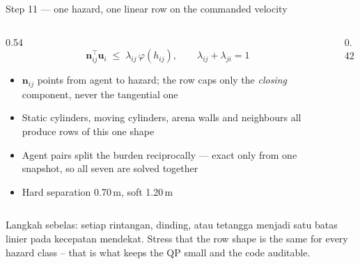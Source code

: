 \documentclass[aspectratio=169,11pt,t]{beamer}
\begin{document}
\begin{frame}{Step 11 --- one hazard, one linear row on the commanded velocity}
  \begin{columns}[T,onlytextwidth]
    \begin{column}{0.54\textwidth}
      \vskip1mm {\small
      \[ \mathbf{n}_{ij}^{\top}\mathbf{u}_i\;\le\;\lambda_{ij}\,\varphi(h_{ij}),
         \qquad \lambda_{ij}+\lambda_{ji}=1 \]}
      \begin{itemize}\bulletgap\scriptsize
        \item $\mathbf{n}_{ij}$ points from agent to hazard; the row caps only
              the \emph{closing} component, never the tangential one
        \item Static cylinders, moving cylinders, arena walls and neighbours all
              produce rows of this one shape
        \item Agent pairs split the burden reciprocally --- exact only from one
              snapshot, so all seven are solved together
        \item Hard separation 0.70\,m, soft 1.20\,m
      \end{itemize}
    \end{column}
    \begin{column}{0.42\textwidth}
      \centering\vskip2mm
      \scalebox{0.60}{\diagrow}
    \end{column}
  \end{columns}
    {Langkah sebelas: setiap rintangan, dinding, atau tetangga menjadi satu batas linier pada kecepatan mendekat.}
    {Stress that the row shape is the same for every hazard class --
        that is what keeps the QP small and the code auditable.}
\end{frame}
\end{document}
